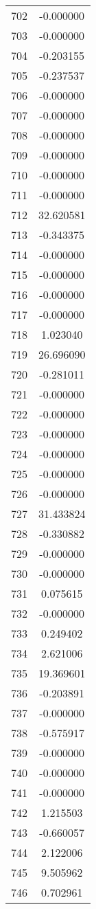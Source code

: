 \documentclass[12pt]{article}
\begin{document}
\begin{longtable}{@{}cc@{}}
702 & -0.000000 \\
703 & -0.000000 \\
704 & -0.203155 \\
705 & -0.237537 \\
706 & -0.000000 \\
707 & -0.000000 \\
708 & -0.000000 \\
709 & -0.000000 \\
710 & -0.000000 \\
711 & -0.000000 \\
712 & 32.620581 \\
713 & -0.343375 \\
714 & -0.000000 \\
715 & -0.000000 \\
716 & -0.000000 \\
717 & -0.000000 \\
718 & 1.023040 \\
719 & 26.696090 \\
720 & -0.281011 \\
721 & -0.000000 \\
722 & -0.000000 \\
723 & -0.000000 \\
724 & -0.000000 \\
725 & -0.000000 \\
726 & -0.000000 \\
727 & 31.433824 \\
728 & -0.330882 \\
729 & -0.000000 \\
730 & -0.000000 \\
731 & 0.075615 \\
732 & -0.000000 \\
733 & 0.249402 \\
734 & 2.621006 \\
735 & 19.369601 \\
736 & -0.203891 \\
737 & -0.000000 \\
738 & -0.575917 \\
739 & -0.000000 \\
740 & -0.000000 \\
741 & -0.000000 \\
742 & 1.215503 \\
743 & -0.660057 \\
744 & 2.122006 \\
745 & 9.505962 \\
746 & 0.702961 \\

\end{longtable}
\end{document}
